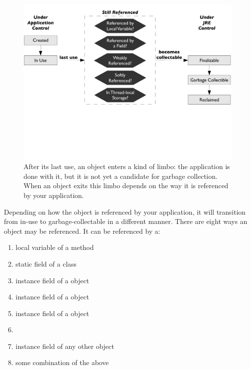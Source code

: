 \begin{figure}
	\centering
	\includegraphics[width=\textwidth]{part4/Figures/lifetime/states}
	\caption{After its last use, an object enters a kind of limbo: the application
	is done with it, but it is not yet a candidate for garbage collection. When an
	object exits this limbo depends on the way it is referenced by your
	application.}
		\label{fig:limbo-exit}
\end{figure}

Depending on how the object is referenced by your application, it will
transition from in-use to garbage-collectable in a different manner. There are
eight ways an object may be referenced. It can be referenced by a:

\begin{enumerate}
  \item local variable of a method
  \item static field of a class
  \item instance field of a  object
  \item instance field of a  object
  \item instance field of a  object
  \item \tls
  \item instance field of any other object
  \item some combination of the above
\end{enumerate}

